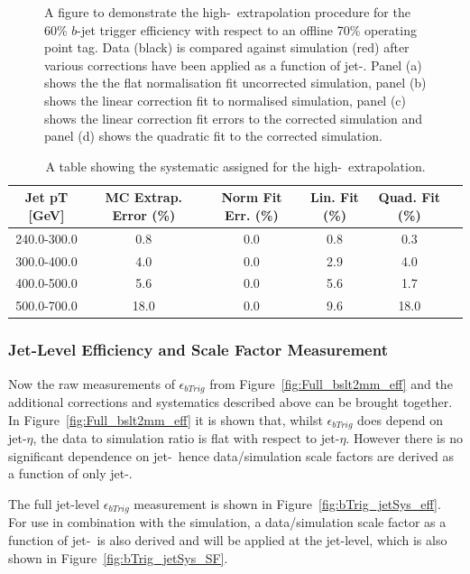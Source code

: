 \begin{figure}[!ht]
\begin{center}
\end{center}
\caption{A figure to demonstrate the high-\pT~extrapolation procedure for the 60\% $b$-jet trigger efficiency with respect to an offline 70\% operating point tag.
  Data (black) is compared against simulation (red) after various corrections have been applied  as a function of jet-\pT.
  Panel (a) shows the the flat normalisation fit uncorrected simulation, panel (b) shows the linear correction fit to normalised simulation,
  panel (c) shows the linear correction fit errors to the corrected simulation and panel (d) shows the quadratic fit to the corrected simulation.
  }
\label{fig:bTrig_mcExtrap}
\end{figure}

\begin{table}[!ht]
\begin{tabular}{|c||c||c|c|c|c|}
  \hline
  Jet pT [GeV] & MC Extrap. Error (\%) & Norm Fit Err. (\%) & Lin. Fit (\%) & Quad. Fit (\%)\\
  \hline
  240.0-300.0 & 0.8 & 0.0  & 0.8 & 0.3\\
  300.0-400.0 & 4.0 & 0.0  & 2.9 & 4.0\\
  400.0-500.0 & 5.6 & 0.0  & 5.6 & 1.7\\
  500.0-700.0 & 18.0 & 0.0 & 9.6 & 18.0\\
  \hline
\end{tabular}
  \vspace{10pt}
\caption{A table showing the systematic assigned for the high-\pT~extrapolation.}
\label{tab:bTrig_extrapSyst}
\end{table}

\FloatBarrier


\subsubsection{Jet-Level Efficiency and Scale Factor Measurement}
\label{sec:trig-jetLevelEff}

Now the raw measurements of $\epsilon_{bTrig}$ from Figure~\ref{fig:Full_bslt2mm_eff}
and the additional corrections and systematics described above can be brought together.
In Figure~\ref{fig:Full_bslt2mm_eff} it is shown that, whilst $\epsilon_{bTrig}$ does depend on jet-$\eta$,
the data to simulation ratio is flat with respect to jet-$\eta$.
However there is no significant dependence on jet-\pT~hence data/simulation scale factors are derived as a function of only jet-\pT. 

The full jet-level $\epsilon_{bTrig}$ measurement is shown in Figure~\ref{fig:bTrig_jetSys_eff}.
For use in combination with the simulation, a data/simulation scale factor as a
function of jet-\pT~is also derived and will be applied at the jet-level, which is also shown in Figure~\ref{fig:bTrig_jetSys_SF}.

